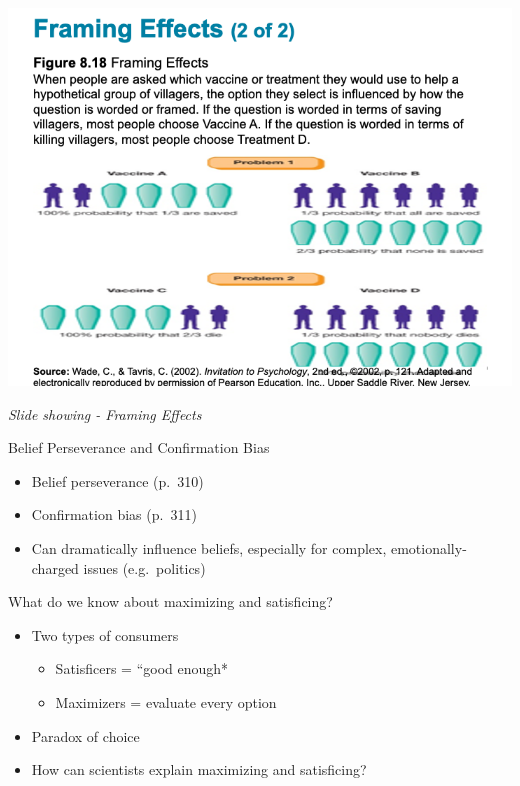 \documentclass[
]{book}
\providecommand{\tightlist}{%
  \setlength{\itemsep}{0pt}\setlength{\parskip}{0pt}}
\begin{document}
\includegraphics{assets/unit_1/slide_63.png}

\emph{Slide showing - Framing Effects}

Belief Perseverance and Confirmation Bias

\begin{itemize}
\item
  Belief perseverance (p.~310)\\
\item
  Confirmation bias (p.~311)
\item
  Can dramatically influence beliefs, especially for complex, emotionally-charged issues (e.g.~politics)
\end{itemize}

What do we know about maximizing and satisficing?

\begin{itemize}
\item
  Two types of consumers

  \begin{itemize}
  \tightlist
  \item
    Satisficers = ``good enough*\\
  \item
    Maximizers = evaluate every option\\
  \end{itemize}
\item
  Paradox of choice
\item
  How can scientists explain maximizing and satisficing?
\end{itemize}
\end{document}
